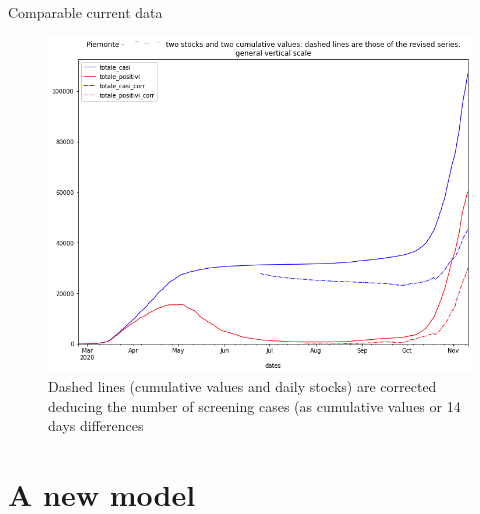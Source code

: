 \documentclass[8pt]{beamer}
\begin{document}
\begin{frame}{Comparable current data}

\begin{figure}[H]
\center
\includegraphics[scale=0.26]{comparableCurrent.png}

\caption{Dashed lines (cumulative values and daily stocks) are corrected deducing the number of screening cases (as cumulative values or 14 days differences} 
\label{comparableCurrent}
\end{figure}

\end{frame}

\section{A new model}
\end{document}
